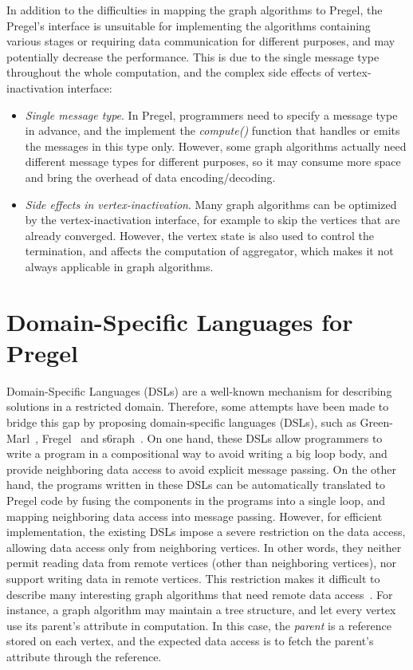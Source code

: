 \documentclass{sokendai_thesis} %
\begin{document}
In addition to the difficulties in mapping the graph algorithms to Pregel, the Pregel's interface is unsuitable for implementing the algorithms containing various stages or requiring data communication for different purposes, and may potentially decrease the performance.
This is due to the single message type throughout the whole computation, and the complex side effects of vertex-inactivation interface:
\begin{itemize}\setlength\itemsep{0em}
\item
 \textit{Single message type}.
 In Pregel, programmers need to specify a message type in advance, and the implement the \emph{compute()} function that handles or emits the messages in this type only.
 However, some graph algorithms actually need different message types for different purposes, so it may consume more space and bring the overhead of data encoding/decoding.
\item
 \textit{Side effects in vertex-inactivation}.
 Many graph algorithms can be optimized by the vertex-inactivation interface, for example to skip the vertices that are already converged.
 However, the vertex state is also used to control the termination, and affects the computation of aggregator, which makes it not always applicable in graph algorithms.
\end{itemize}

\section{Domain-Specific Languages for Pregel}

Domain-Specific Languages (DSLs) are a well-known mechanism for describing solutions in a restricted domain.
Therefore, some attempts have been made to bridge this gap by proposing domain-specific languages (DSLs), such as Green-Marl~\cite{green14}, Fregel~\cite{fregel} and s6raph~\cite{s6raph}.
On one hand, these DSLs allow programmers to write a program in a compositional way to avoid writing a big loop body, and provide neighboring data access to avoid explicit message passing.
On the other hand, the programs written in these DSLs can be automatically translated to Pregel code by fusing the components in the programs into a single loop, and mapping neighboring data access into message passing.
However, for efficient implementation, the existing DSLs impose a severe restriction on the data access, allowing data access only from neighboring vertices.
In other words, they neither permit reading data from remote vertices (other than neighboring vertices), nor support writing data in remote vertices.
This restriction makes it difficult to describe many interesting graph algorithms that need remote data access~\cite{optimizing,connectivity}.
For instance, a graph algorithm may maintain a tree structure, and let every vertex use its parent's attribute in computation.
In this case, the \textit{parent} is a reference stored on each vertex, and the expected data access is to fetch the parent's attribute through the reference.
\end{document}
